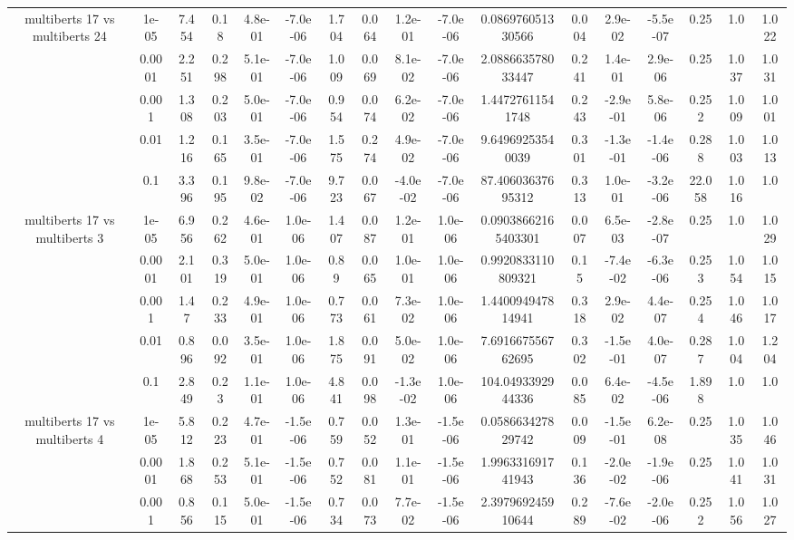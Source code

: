 \begin{tabular}{|c|c|c|c|c|c|c|c|c|c|c|c|c|c|c|c|c|}
\hline
\multirow{5}{*}{multiberts 17 vs multiberts 24} & 1e-05 & 7.454 & 0.18 & 4.8e-01 & -7.0e-06 & 1.704 & 0.064 & 1.2e-01 & -7.0e-06 & 0.086976051330566 & 0.004 & 2.9e-02 & -5.5e-07 & 0.25 & 1.0 & 1.022 \\
 & 0.0001 & 2.251 & 0.298 & 5.1e-01 & -7.0e-06 & 1.009 & 0.069 & 8.1e-02 & -7.0e-06 & 2.088663578033447 & 0.241 & 1.4e-01 & 2.9e-06 & 0.25 & 1.037 & 1.031 \\
 & 0.001 & 1.308 & 0.203 & 5.0e-01 & -7.0e-06 & 0.954 & 0.074 & 6.2e-02 & -7.0e-06 & 1.44727611541748 & 0.243 & -2.9e-01 & 5.8e-06 & 0.252 & 1.009 & 1.001 \\
 & 0.01 & 1.216 & 0.165 & 3.5e-01 & -7.0e-06 & 1.575 & 0.274 & 4.9e-02 & -7.0e-06 & 9.64969253540039 & 0.301 & -1.3e-01 & -1.4e-06 & 0.288 & 1.003 & 1.013 \\
 & 0.1 & 3.396 & 0.195 & 9.8e-02 & -7.0e-06 & 9.723 & 0.067 & -4.0e-02 & -7.0e-06 & 87.40603637695312 & 0.313 & 1.0e-01 & -3.2e-06 & 22.058 & 1.016 & 1.0 \\
\hline
\multirow{5}{*}{multiberts 17 vs multiberts 3} & 1e-05 & 6.956 & 0.262 & 4.6e-01 & 1.0e-06 & 1.407 & 0.087 & 1.2e-01 & 1.0e-06 & 0.09038662165403301 & 0.007 & 6.5e-03 & -2.8e-07 & 0.25 & 1.0 & 1.029 \\
 & 0.0001 & 2.101 & 0.319 & 5.0e-01 & 1.0e-06 & 0.89 & 0.065 & 1.0e-01 & 1.0e-06 & 0.9920833110809321 & 0.15 & -7.4e-02 & -6.3e-06 & 0.253 & 1.054 & 1.015 \\
 & 0.001 & 1.47 & 0.233 & 4.9e-01 & 1.0e-06 & 0.773 & 0.061 & 7.3e-02 & 1.0e-06 & 1.440094947814941 & 0.318 & 2.9e-02 & 4.4e-07 & 0.254 & 1.046 & 1.017 \\
 & 0.01 & 0.896 & 0.092 & 3.5e-01 & 1.0e-06 & 1.875 & 0.091 & 5.0e-02 & 1.0e-06 & 7.691667556762695 & 0.302 & -1.5e-01 & 4.0e-07 & 0.287 & 1.004 & 1.204 \\
 & 0.1 & 2.849 & 0.23 & 1.1e-01 & 1.0e-06 & 4.841 & 0.098 & -1.3e-02 & 1.0e-06 & 104.0493392944336 & 0.085 & 6.4e-02 & -4.5e-06 & 1.898 & 1.0 & 1.0 \\
\hline
\multirow{5}{*}{multiberts 17 vs multiberts 4} & 1e-05 & 5.812 & 0.223 & 4.7e-01 & -1.5e-06 & 0.759 & 0.052 & 1.3e-01 & -1.5e-06 & 0.058663427829742 & 0.009 & -1.5e-01 & 6.2e-08 & 0.25 & 1.035 & 1.046 \\
 & 0.0001 & 1.868 & 0.253 & 5.1e-01 & -1.5e-06 & 0.752 & 0.081 & 1.1e-01 & -1.5e-06 & 1.996331691741943 & 0.136 & -2.0e-02 & -1.9e-06 & 0.25 & 1.041 & 1.031 \\
 & 0.001 & 0.856 & 0.115 & 5.0e-01 & -1.5e-06 & 0.734 & 0.073 & 7.7e-02 & -1.5e-06 & 2.397969245910644 & 0.289 & -7.6e-02 & -2.0e-06 & 0.252 & 1.056 & 1.027 \\

\end{tabular}

